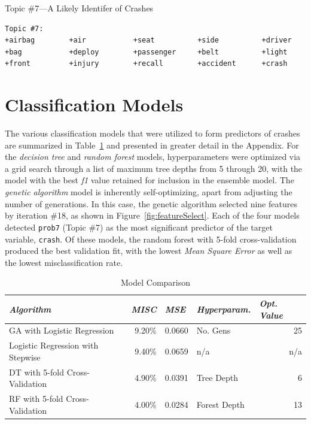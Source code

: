 \documentclass[12pt]{article}
\begin{document}
\begin{table}
\caption{Topic \#7---A Likely Identifer of Crashes}
\label{tab:cluster}
{\footnotesize
\begin{lstlisting}
Topic #7: 
+airbag        +air           +seat          +side          +driver        
+bag           +deploy        +passenger     +belt          +light         
+front         +injury        +recall        +accident      +crash         
\end{lstlisting}
}
\end{table}


\section{Classification Models}
The various classification models that were utilized to form predictors of crashes are summarized in Table~\ref{tab:modelComp} and presented in greater detail in the Appendix. For the \textit{decision tree} and \textit{random forest} models, hyperparameters were optimized via a grid search through a list of maximum tree depths from 5 through 20, with the model with the best \textit{f1} value retained for inclusion in the ensemble model. The \textit{genetic algorithm} model is inherently self-optimizing, apart from adjusting the number of generations. In this case, the genetic algorithm selected nine features by iteration \#18, as shown in Figure~\ref{fig:featureSelect}. Each of the four models detected \texttt{prob7} (Topic \#7) as the most significant predictor of the target variable, \texttt{crash}. Of these models, the random forest with 5-fold cross-validation produced the best validation fit, with the lowest \textit{Mean Square Error} as well as the lowest misclassification rate.

\begin{table}[htbp]
  \centering
  \caption{Model Comparison}
    \begin{tabular}{lrrlr}
    \textit{Algorithm} & \multicolumn{1}{l}{\textit{MISC}} & \multicolumn{1}{l}{\textit{MSE}} & \textit{Hyperparam.} & \multicolumn{1}{l}{\textit{Opt. Value}} \bigstrut[b]\\
    \hline
    GA with Logistic Regression & 9.20\% & 0.0660 & No. Gens & 25 \bigstrut[t]\\
    Logistic Regression with Stepwise & 9.40\% & 0.0659 & n/a   & n/a \\
    DT with 5-fold Cross-Validation & 4.90\% & 0.0391 & Tree Depth & 6 \\
    RF with 5-fold Cross-Validation & 4.00\% & 0.0284 & Forest Depth & 13 \\
    \hline
    \end{tabular}%
  \label{tab:modelComp}%
\end{table}%
\end{document}
